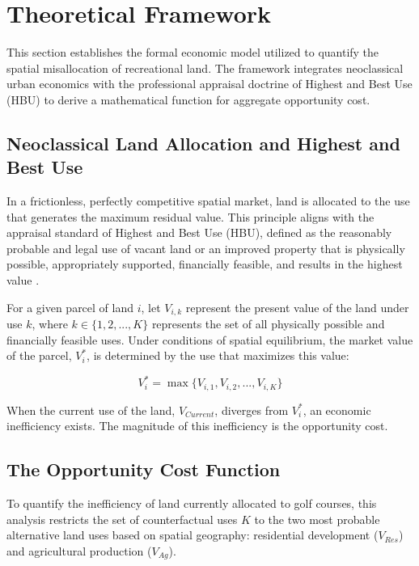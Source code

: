 \documentclass[10pt, letterpaper]{article}
\begin{document}
\newpage

\section{Theoretical Framework}

This section establishes the formal economic model utilized to quantify the spatial misallocation of recreational land. The framework integrates neoclassical urban economics with the professional appraisal doctrine of Highest and Best Use (HBU) to derive a mathematical function for aggregate opportunity cost.

\subsection{Neoclassical Land Allocation and Highest and Best Use}
In a frictionless, perfectly competitive spatial market, land is allocated to the use that generates the maximum residual value. This principle aligns with the appraisal standard of Highest and Best Use (HBU), defined as the reasonably probable and legal use of vacant land or an improved property that is physically possible, appropriately supported, financially feasible, and results in the highest value \parencite{AppraisalInstitute2020}. 

For a given parcel of land $i$, let $V_{i,k}$ represent the present value of the land under use $k$, where $k \in \{1, 2, ..., K\}$ represents the set of all physically possible and financially feasible uses. Under conditions of spatial equilibrium, the market value of the parcel, $V_i^*$, is determined by the use that maximizes this value:

\begin{equation}
    V_i^* = \max \{V_{i,1}, V_{i,2}, ..., V_{i,K}\}
\end{equation}

When the current use of the land, $V_{Current}$, diverges from $V_i^*$, an economic inefficiency exists. The magnitude of this inefficiency is the opportunity cost.

\subsection{The Opportunity Cost Function}
To quantify the inefficiency of land currently allocated to golf courses, this analysis restricts the set of counterfactual uses $K$ to the two most probable alternative land uses based on spatial geography: residential development ($V_{Res}$) and agricultural production ($V_{Ag}$). 
\end{document}
